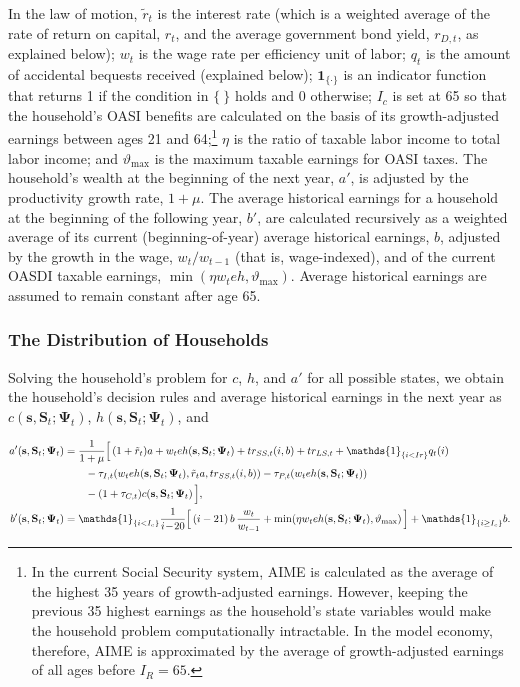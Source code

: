 \documentclass[11pt,leqno,fleqn]{article}
\newcommand{\ind}{\mathds{1}}
\begin{document}
In the law of motion, $\tilde{r}_{t}$ is the interest rate (which is a weighted average of the rate of return on capital, $r_{t}$, and the average government bond yield, $r_{D,t}$, as explained below); $w_{t}$ is the wage rate per efficiency unit of labor; $q_{t}$ is the amount of accidental bequests received (explained below); $\mathbf{1}_{\{\cdot\}}$ is an indicator function that returns 1 if the condition in $\{\ \}$ holds and 0 otherwise; $I_{c}$ is set at 65 so that the household's OASI benefits are calculated on the basis of its growth-adjusted earnings between ages 21 and 64;\footnote{In the current Social Security system, AIME is calculated as the average of the highest 35 years of growth-adjusted earnings. However, keeping the previous 35 highest earnings as the household's state variables would make the household problem computationally intractable. In the model economy, therefore, AIME is approximated by the average of growth-adjusted earnings of all ages before $I_{R}=65$.} $\eta$ is the ratio of taxable labor income to total labor income; and $\vartheta_{\max}$ is the maximum taxable earnings for OASI taxes. The household's wealth at the beginning of the next year, $a'$, is adjusted by the productivity growth rate, $1+\mu$. The average historical earnings for a household at the beginning of the following year, $b'$, are calculated recursively as a weighted average of its current (beginning-of-year) average historical earnings, $b$, adjusted by the growth in the wage, $w_{t}/w_{t-1}$ (that is, wage-indexed), and of the current OASDI taxable earnings, $\min(\eta w_{t}eh,\vartheta_{\max})$. Average historical earnings are assumed to remain constant after age 65.


\subsubsection{The Distribution of Households}

Solving the household's problem for $c$, $h$, and $a'$ for all possible states, we obtain the household's decision rules and average historical earnings in the next year as $c(\mathbf{s},\mathbf{S}_{t};\mathbf{\Psi}_{t})$, $h(\mathbf{s},\mathbf{S}_{t};\mathbf{\Psi}_{t})$, and

\begin{align*}
	a'(\mathbf{s},\mathbf{S}_{t};\mathbf{\Psi}_{t})
	&=\frac{1}{1+\mu}\Bigl[\,(1+\tilde{r}_{t})a+w_{t}eh(\mathbf{s},
	\mathbf{S}_{t};
	\mathbf{\Psi}_{t})+tr_{SS,t}(i,b)+tr_{LS,t}+\ind_{\{i<Ir\}}q_{t}(i)\\
	&\qquad-\tau_{I,t}(w_{t}eh(\mathbf{s},\mathbf{S}_{t};\mathbf{\Psi}_{t}),
	\tilde{r}_{t}a,tr_{SS,t}(i,b))
	-\tau_{P,t}(w_{t}eh(\mathbf{s},\mathbf{S}_{t};\mathbf{\Psi}_{t}))\\
	&\qquad-(1+\tau_{C,t})c(\mathbf{s},\mathbf{S}_{t};\mathbf{\Psi}_{t})
	\,\Bigr],\\
	b'(\mathbf{s},\mathbf{S}_{t};\mathbf{\Psi}_{t})
	&=\ind_{\{i<I_c\}}\frac{1}{i\!-\!20}\Bigl[\,(i-21)\,b\,
	\frac{w_{t}}{w_{t-1}}+\min(\eta w_{t}eh(\mathbf{s},\mathbf{S}_{t};
	\mathbf{\Psi}_{t}),\vartheta_{\max})\,\Bigr]
	+\ind_{\{i\geq I_c\}}b.
\end{align*}
\end{document}
